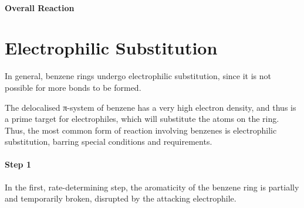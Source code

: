 			\paragraph{Overall Reaction}





































	\pagebreak
	\hypertarget{AppendixElectrophilicSubstitution}{}
	\section{Electrophilic Substitution}

		In general, benzene rings undergo electrophilic substitution, since it is not possible for more bonds to be formed.

		The delocalised π-system of benzene has a very high electron density, and thus is a prime target for electrophiles, which
		will substitute the  atoms on the ring. Thus, the most common form of reaction involving benzenes is electrophilic
		substitution, barring special conditions and requirements.

		\paragraph{Step 1}

		In the first, rate-determining step, the aromaticity of the benzene ring is partially and temporarily broken, disrupted by
		the attacking electrophile.

